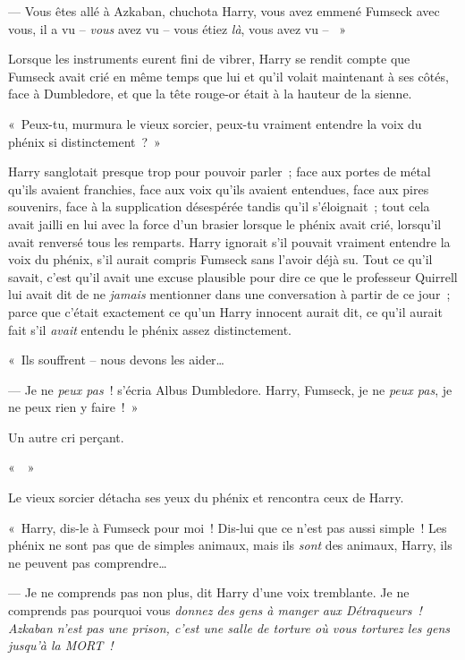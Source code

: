 --- Vous êtes allé à Azkaban, chuchota Harry, vous avez emmené Fumseck avec vous, il a vu -- \emph{vous} avez vu -- vous étiez \emph{là}, vous avez vu -- ~»

Lorsque les instruments eurent fini de vibrer, Harry se rendit compte que Fumseck avait crié en même temps que lui et qu'il volait maintenant à ses côtés, face à Dumbledore, et que la tête rouge-or était à la hauteur de la sienne.

«~Peux-tu, murmura le vieux sorcier, peux-tu vraiment entendre la voix du phénix si distinctement~?~»

Harry sanglotait presque trop pour pouvoir parler~; face aux portes de métal qu'ils avaient franchies, face aux voix qu'ils avaient entendues, face aux pires souvenirs, face à la supplication désespérée tandis qu'il s'éloignait~; tout cela avait jailli en lui avec la force d'un brasier lorsque le phénix avait crié, lorsqu'il avait renversé tous les remparts.
Harry ignorait s'il pouvait vraiment entendre la voix du phénix, s'il aurait compris Fumseck sans l'avoir déjà su.
Tout ce qu'il savait, c'est qu'il avait une excuse plausible pour dire ce que le professeur Quirrell lui avait dit de ne \emph{jamais} mentionner dans une conversation à partir de ce jour~; parce que c'était exactement ce qu'un Harry innocent aurait dit, ce qu'il aurait fait s'il \emph{avait} entendu le phénix assez distinctement.

«~Ils souffrent -- nous devons les aider…

--- Je ne \emph{peux pas}~! s'écria Albus Dumbledore.
Harry, Fumseck, je ne \emph{peux pas}, je ne peux rien y faire~!~»

Un autre cri perçant.

«~~»

Le vieux sorcier détacha ses yeux du phénix et rencontra ceux de Harry.

«~Harry, dis-le à Fumseck pour moi~!
Dis-lui que ce n'est pas aussi simple~!
Les phénix ne sont pas que de simples animaux, mais ils \emph{sont} des animaux, Harry, ils ne peuvent pas comprendre…

--- Je ne comprends pas non plus, dit Harry d'une voix tremblante.
Je ne comprends pas pourquoi vous \emph{donnez des gens à manger aux Détraqueurs~!
Azkaban n'est pas une prison, c'est une salle de torture où vous torturez les gens jusqu'à la MORT~!}

